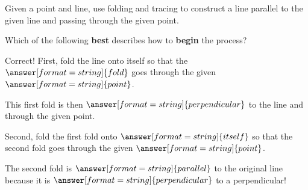 \documentclass[nooutcomes]{ximera}
\begin{document}
\begin{problem}
Given a point and line, use folding and tracing to construct a line parallel to the given line and passing through the given point. 
\begin{image}
\end{image}
Which of the following \textbf{best} describes how to \textbf{begin} the process?  
\begin{multipleChoice}
\end{multipleChoice}
\begin{problem}
Correct!  First, fold the line onto itself so that the $\answer[format=string]{fold}$ goes through the given $\answer[format=string]{point}$.

This first fold is then $\answer[format=string]{perpendicular}$ to the line and through the given point.  

Second, fold the first fold onto $\answer[format=string]{itself}$ so that the second fold goes through the given $\answer[format=string]{point}$.

The second fold is $\answer[format=string]{parallel}$ to the original line because it is $\answer[format=string]{perpendicular}$ to a perpendicular!  
\end{problem}
\end{problem}
\end{document}
